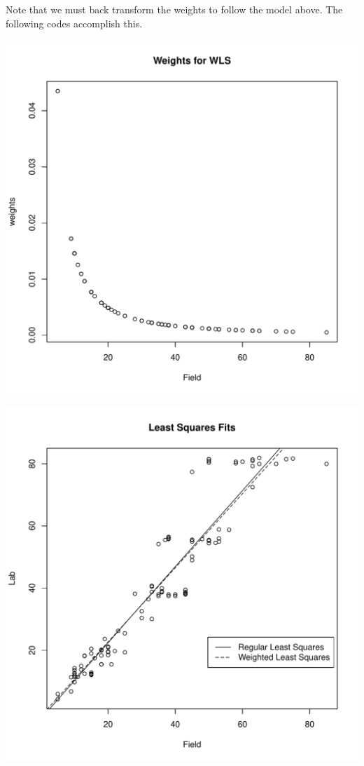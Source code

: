 \documentclass{homework}
\begin{document}
\begin{longproblem}
\begin{solution}
Note that we must back transform the weights to follow the model above.  The following codes accomplish this.

\begin{minipage}{.5\textwidth}
\includegraphics[width=.8\textwidth]{weights.pdf}
\end{minipage}
\begin{minipage}{.5\textwidth}
\includegraphics[width=.8\textwidth]{wls_nist.pdf}
\end{minipage}
\begin{minipage}{.5\textwidth}

\end{minipage}
\end{solution}
\end{longproblem}
\end{document}
